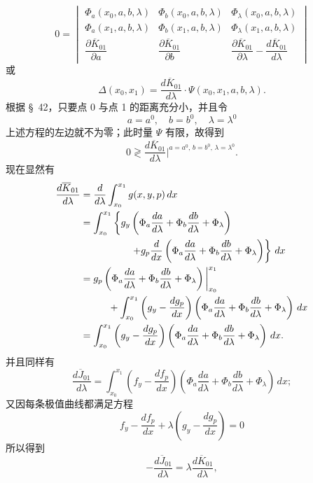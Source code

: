 \documentclass[11pt,a4paper,leqno]{article}
\begin{document}
\[
0=\begin{vmatrix}
\Phi_a(x_0,a,b,\lambda)&\Phi_b(x_0,a,b,\lambda)&\Phi_\lambda(x_0,a,b,\lambda)\\
\Phi_a(x_1,a,b,\lambda)&\Phi_b(x_1,a,b,\lambda)&\Phi_\lambda(x_1,a,b,\lambda)\\
\dfrac{\partial\overline{K}_{01}}{\partial a}&\dfrac{\partial\overline{K}_{01}}{\partial b}&\dfrac{\partial\overline{K}_{01}}{\partial\lambda}-\dfrac{d\overline{K}_{01}}{d\lambda}
\end{vmatrix}
\]
或
\[
\Delta(x_0,x_1)=\frac{d\overline{K}_{01}}{d\lambda}\cdot\Psi(x_0,x_1,a,b,\lambda).
\]
根据 \S~42，只要点 0 与点 1 的距离充分小，并且令
\begin{equation}\tag{7}
a=a^0,\quad b=b^0,\quad \lambda=\lambda^0
\end{equation}
上述方程的左边就不为零；此时量 $\Psi$ 有限，故得到
\begin{equation}\tag{8}
0\gtrless \frac{d\overline{K}_{01}}{d\lambda}\bigg|^{a=a^0,\,b=b^0,\,\lambda=\lambda^0}.
\end{equation}
现在显然有
\[
\begin{aligned}
\frac{d\overline{K}_{01}}{d\lambda}
&=\frac{d}{d\lambda}\int_{x_0}^{x_1}g(x,y,p)\,dx \\
&=\int_{x_0}^{x_1}\left\{g_y\left(\Phi_a\frac{da}{d\lambda}+\Phi_b\frac{db}{d\lambda}+\Phi_\lambda\right)\right.\\
&\hspace{18mm}\left.+g_p\frac{d}{dx}\left(\Phi_a\frac{da}{d\lambda}+\Phi_b\frac{db}{d\lambda}+\Phi_\lambda\right)\right\}\,dx \\
&=g_p\left(\Phi_a\frac{da}{d\lambda}+\Phi_b\frac{db}{d\lambda}+\Phi_\lambda\right)\bigg|_{x_0}^{x_1}\\
&\hspace{10mm}+\int_{x_0}^{x_1}\left(g_y-\frac{dg_p}{dx}\right)
\left(\Phi_a\frac{da}{d\lambda}+\Phi_b\frac{db}{d\lambda}+\Phi_\lambda\right)\,dx \\
&=\int_{x_0}^{x_1}\left(g_y-\frac{dg_p}{dx}\right)
\left(\Phi_a\frac{da}{d\lambda}+\Phi_b\frac{db}{d\lambda}+\Phi_\lambda\right)\,dx.
\end{aligned}
\]
并且同样有
\[
\frac{d\overline{J}_{01}}{d\lambda}
=\int_{x_0}^{x_1}\left(f_y-\frac{df_p}{dx}\right)
\left(\Phi_a\frac{da}{d\lambda}+\Phi_b\frac{db}{d\lambda}+\Phi_\lambda\right)\,dx;
\]
又因每条极值曲线都满足方程
\[
f_y-\frac{df_p}{dx}+\lambda\left(g_y-\frac{dg_p}{dx}\right)=0
\]
所以得到
\begin{equation}\tag{9}
-\frac{d\overline{J}_{01}}{d\lambda}=\lambda\frac{d\overline{K}_{01}}{d\lambda},
\end{equation}
\end{document}

